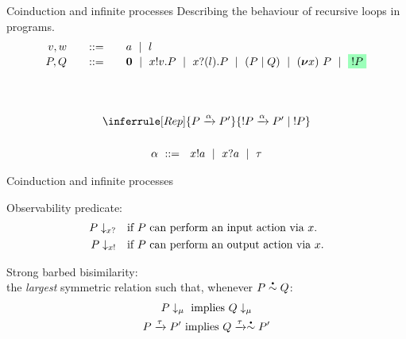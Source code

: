 \documentclass[aspectratio=169,hyperref={pdfpagelabels=false}]{beamer}
\begin{document}
\begin{frame}{Coinduction and infinite processes}
  Describing the behaviour of recursive loops in programs.
\begin{displaymath}
  \begin{array}{r@{\qquad}c@{\qquad}l}
    v,w & ::= & a \ \mid\ l \\
    P,Q & ::= & \Pend
               \ \mid\ \Pout{x}{v}{P}
               \ \mid\  \Pin{x}{l}{P}
               \ \mid\  \PBpar{P}{Q}
               \ \mid\  \Pres{x}{}{P}
               \ \mid\  \hg{!P}
  \end{array}
\end{displaymath}
  \ \\ \ \\

  \[
  \begin{array}{c}
    \inferrule[Rep]{\transition{P}{\alpha}{P'}}{\transition{\Preplicate{P}}{\alpha}{\Ppar{P'}{\Preplicate{P}}}} \\[6mm]
    \alpha\ ::= \ \ \Aoutf{x}{a} \ \mid\ \Ain{x}{a} \ \mid\ \Atau
  \end{array}
  \]

\end{frame}

\begin{frame}{Coinduction and infinite processes}

  Observability predicate:
  \begin{align*}
  P\downarrow_{x?}  &\quad \textrm{if \( P \) can perform an input action via \( x \).} \\
  P\downarrow_{x!} &\quad \textrm{if \( P \) can perform an output action via \( x \).}
  \end{align*}

  Strong barbed bisimilarity:\\
  \textrm{the \emph{largest} symmetric relation such that, whenever \( \sbbisim{P}{Q} \):}
\begin{gather}
  \observable{P}{\mu}~\textrm{implies}~\observable{Q}{\mu}\label{eq:bisim1} \\
  \transition{P}{\Atau}{P'}~\textrm{implies}~\transition{Q}{\Atau}{\sbbisim{}{} P'}%
\end{gather}
  

  


\end{frame}
\end{document}
